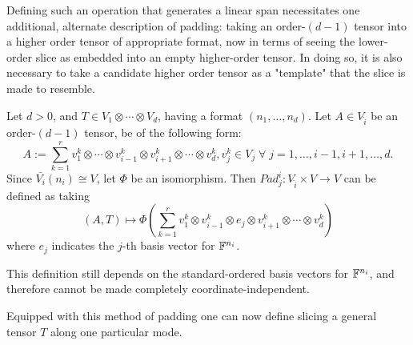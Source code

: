\documentclass[../Lael_John_MasterThesis_Draft.tex]{subfiles}
\begin{document}
Defining such an operation that generates a linear span necessitates one additional, alternate description of padding: taking an order-$(d-1)$ tensor into a higher order tensor of appropriate format, now in terms of seeing the lower-order slice as embedded into an empty higher-order tensor. In doing so, it is also necessary to take a candidate higher order tensor as a "template" that the slice is made to resemble.
\begin{definition}\label{defn:paddinghigherorder}

    Let $d > 0$, and $T \in V_1 \otimes \cdots \otimes V_d$, having a format $(n_1, \ldots, n_d)$. Let $A \in V_{\hat{i}}$ be an order-$(d-1)$ tensor, be of the following form: 
    $$A := \sum_{k=1}^{r} v_1^k \otimes \cdots \otimes v_{i-1}^k \otimes v_{i+1}^k \otimes \cdots \otimes v_d^k, v_j^k \in V_j \;\forall\; j = 1, \ldots, i-1, i+1, \ldots, d.$$
    Since $\bar{V_i}(n_i) \cong V$, let $\Phi$ be an isomorphism. Then $Pad^i_j: V_{\hat{i}} \times V \to V$ can be defined as taking $$(A, T)\mapsto \Phi \left(\sum_{k=1}^{r}v_1^k \otimes v_{i-1}^k \otimes e_j \otimes v_{i+1}^k \otimes \cdots \otimes v_d^k\right)$$where $e_j$ indicates the $j$-th basis vector for $\mathbb{F}^{n_i}$.
\end{definition}
\begin{remark}
    This definition still depends on the standard-ordered basis vectors for $\mathbb{F}^{n_i}$, and therefore cannot be made completely coordinate-independent.
\end{remark}
Equipped with this method of padding one can now define slicing a general tensor $T$ along one particular mode.
\end{document}
